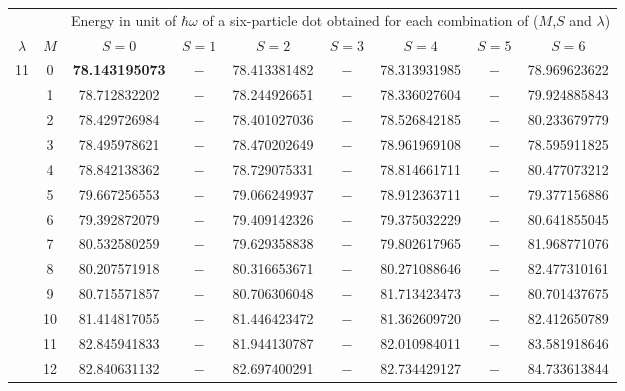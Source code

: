 \begin{table}[ht]
\centering      %
{\scriptsize
\begin{tabular}{c|c|c|c|c|c|c|c|c}  %
\toprule[1pt]
\multicolumn{1}{c|}{ } & \multicolumn{1}{c|}{ } &\multicolumn{7}{c}{Energy in unit of $\hbar \omega$ of a six-particle dot obtained for each combination of ($M$,$S$ and $\lambda$)} \\
$\lambda$ & $M$ & $S=0$& $S=1$ & $S=2$ & $S=3$ & $S=4$ & $S=5$ & $S=6$  \\
\hline                    %
\hline                    %
\multirow{13}{*}{11} & 0 & \textbf{78.143195073} & $-$ & 78.413381482 & $-$ & 78.313931985 & $-$ & 78.969623622 \\
& 1 & 78.712832202 & $-$ & 78.244926651 & $-$ & 78.336027604 & $-$ & 79.924885843 \\
& 2 & 78.429726984 & $-$ & 78.401027036 & $-$ & 78.526842185 & $-$ & 80.233679779 \\
& 3 & 78.495978621 & $-$ & 78.470202649 & $-$ & 78.961969108 & $-$ & 78.595911825 \\
& 4 & 78.842138362 & $-$ & 78.729075331 & $-$ & 78.814661711 & $-$ & 80.477073212 \\
& 5 & 79.667256553 & $-$ & 79.066249937 & $-$ & 78.912363711 & $-$ & 79.377156886 \\
& 6 & 79.392872079 & $-$ & 79.409142326 & $-$ & 79.375032229 & $-$ & 80.641855045 \\
& 7 & 80.532580259 & $-$ & 79.629358838 & $-$ & 79.802617965 & $-$ & 81.968771076 \\
& 8 & 80.207571918 & $-$ & 80.316653671 & $-$ & 80.271088646 & $-$ & 82.477310161 \\
& 9 & 80.715571857 & $-$ & 80.706306048 & $-$ & 81.713423473 & $-$ & 80.701437675 \\
& 10 & 81.414817055 & $-$ & 81.446423472 & $-$ & 81.362609720 & $-$ & 82.412650789 \\
& 11 & 82.845941833 & $-$ & 81.944130787 & $-$ & 82.010984011 & $-$ & 83.581918646 \\
& 12 & 82.840631132 & $-$ & 82.697400291 & $-$ & 82.734429127 & $-$ & 84.733613844 \\


\end{tabular}}
\end{table}
